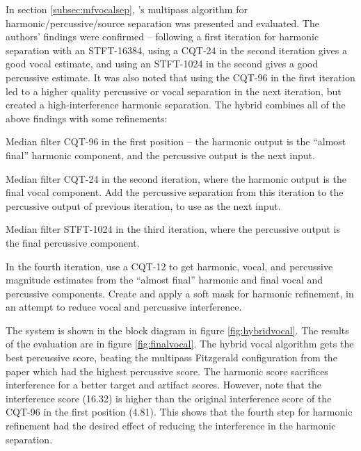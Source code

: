 \documentclass[letter,12pt]{article}
\newenvironment{tight_enumerate}{
\begin{enumerate}
  \setlength{\itemsep}{0pt}
  \setlength{\parskip}{0pt}
}{\end{enumerate}}
\begin{document}
In section \ref{subsec:mfvocalsep}, \citet{fitzgerald2}'s multipass algorithm for harmonic/percussive/source separation was presented and evaluated. The authors' findings were confirmed -- following a first iteration for harmonic separation with an STFT-16384, using a CQT-24 in the second iteration gives a good vocal estimate, and using an STFT-1024 in the second gives a good percussive estimate. It was also noted that using the CQT-96 in the first iteration led to a higher quality percussive or vocal separation in the next iteration, but created a high-interference harmonic separation. The hybrid combines all of the above findings with some refinements:

\begin{tight_enumerate}
	\item
		Median filter CQT-96 in the first position -- the harmonic output is the ``almost final'' harmonic component, and the percussive output is the next input.
	\item
		Median filter CQT-24 in the second iteration, where the harmonic output is the final vocal component. Add the percussive separation from this iteration to the percussive output of previous iteration, to use as the next input.
	\item
		Median filter STFT-1024 in the third iteration, where the percussive output is the final percussive component.
	\item
		In the fourth iteration, use a CQT-12 to get harmonic, vocal, and percussive magnitude estimates from the ``almost final'' harmonic and final vocal and percussive components. Create and apply a soft mask for harmonic refinement, in an attempt to reduce vocal and percussive interference.
\end{tight_enumerate}

The system is shown in the block diagram in figure \ref{fig:hybridvocal}. The results of the evaluation are in figure \ref{fig:finalvocal}. The hybrid vocal algorithm gets the best percussive score, beating the multipass Fitzgerald configuration from the paper \cite{fitzgerald2} which had the highest percussive score. The harmonic score sacrifices interference for a better target and artifact scores. However, note that the interference score (16.32) is higher than the original interference score of the CQT-96 in the first position (4.81). This shows that the fourth step for harmonic refinement had the desired effect of reducing the interference in the harmonic separation.
\end{document}
